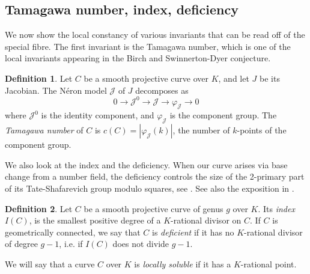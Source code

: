 \documentclass{article}
\theoremstyle{definition}
\newtheorem{defn}{Definition}[section]
\theoremstyle{plain}
\theoremstyle{remark}
\begin{document}
	\subsection{Tamagawa number, index, deficiency}
	We now show the local constancy of various invariants that can be read off of the special fibre. The first invariant is the Tamagawa number, which is one of the local invariants appearing in the Birch and Swinnerton-Dyer conjecture.
	\begin{defn}
		Let $C$ be a smooth projective curve over $K$, and let $J$ be its Jacobian. The Néron model $\mathcal{J}$ of $J$ decomposes as
		\[0\to \mathcal{J}^0\to \mathcal{J}\to \varphi_\mathcal{J}\to 0\]
		where $\mathcal{J}^0$ is the identity component, and $\varphi_{\mathcal{J}}$ is the component group. The \emph{Tamagawa number} of $C$ is $c(C) = |\varphi_\mathcal{J}(k)|$, the number of $k$-points of the component group.
	\end{defn}
	We also look at the index and the deficiency. When our curve arises via base change from a number field, the deficiency controls the size of the 2-primary part of its Tate-Shafarevich group modulo squares, see \cite[Corollary 12]{poonen-stoll}. See also the exposition in \cite[§5.1]{parityranksjacobianscurves}.
	\begin{defn}
		Let $C$ be a smooth projective curve of genus $g$ over $K$. Its \emph{index} $I(C)$, is the smallest positive degree of a $K$-rational divisor on $C$. If $C$ is geometrically connected, we say that $C$ is \emph{deficient} if it has no $K$-rational divisor of degree $g-1$, i.e. if $I(C)$ does not divide $g-1$.
	\end{defn}
	
	We will say that a curve $C$ over $K$ is \emph{locally soluble} if it has a $K$-rational point.
	
\end{document}
